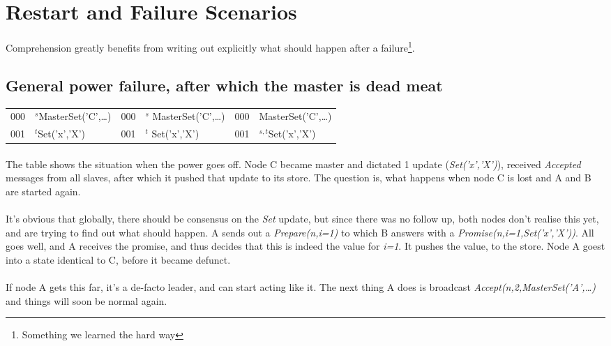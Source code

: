 \section{Restart and Failure Scenarios}
Comprehension greatly benefits from writing out explicitly what should happen after a failure\footnote{Something we learned the hard way}.

\subsection{General power failure, after which the master is dead meat}
\begin{supertabular}{|cl|cl|cl|}
  000 & $^s$MasterSet('C',\ldots) & 000 & $^s$ MasterSet('C',\ldots) & 000 & MasterSet('C',\ldots) \\
  001 & $^t$Set('x','X')          & 001 & $^t$ Set('x','X')          & 001 & $^{s,t}$Set('x','X')   \\
\hline
\end{supertabular}
\paragraph{}
The table shows the situation when the power goes off. 
Node C became master and dictated 1 update (\emph{Set('x','X')}), received \emph{Accepted} messages from all slaves,
after which it pushed that update to its store. 
The question is, what happens when node C is lost and A and B are started again.

\paragraph{}
It's obvious that globally, there should be consensus on the \emph{Set} update, but since there was no follow up, 
both nodes don't realise this yet, and are trying to find out what should happen.
A sends out a \emph{Prepare(n,i=1)} to which B answers with a \emph{Promise(n,i=1,Set('x','X'))}.
All goes well, and A receives the promise, and thus decides that this is indeed the value for \emph{i=1}.
It pushes the value, to the store. Node A goest into a state identical to C, before it became defunct.
\paragraph{}
If node A gets this far, it's a de-facto leader, and can start acting like it. 
The next thing A does is broadcast \emph{Accept(n,2,MasterSet('A',\ldots)} and things will soon be normal again.


